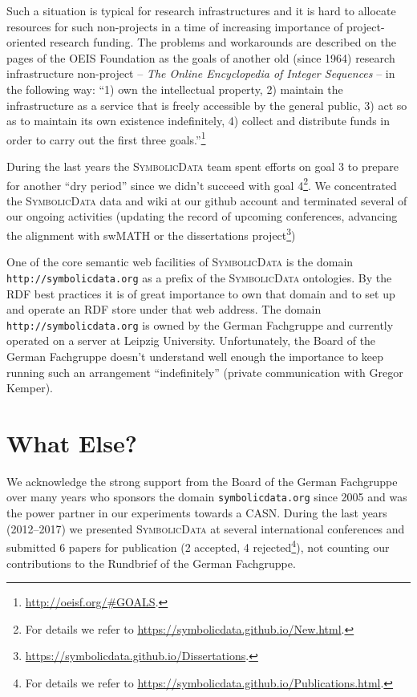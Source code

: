 \documentclass[a4paper,11pt]{article}
\def\SD{\textsc{SymbolicData}}
\begin{document}
Such a situation is typical for research infrastructures and it is hard to
allocate resources for such non-projects in a time of increasing importance of
project-oriented research funding.  The problems and workarounds are described
on the pages of the OEIS Foundation as the goals of another old (since 1964)
research infrastructure non-project -- \emph{The Online Encyclopedia of Integer
  Sequences} -- in the following way: ``1) own the intellectual property, 2)
maintain the infrastructure as a service that is freely accessible by the
general public, 3) act so as to maintain its own existence indefinitely, 4)
collect and distribute funds in order to carry out the first three
goals.''\footnote{\url{http://oeisf.org/\#GOALS}.}

During the last years the {\SD} team spent efforts on goal 3 to prepare for
another ``dry period'' since we didn't succeed with goal 4\footnote{For details
  we refer to \url{https://symbolicdata.github.io/New.html}.}.  We concentrated
the {\SD} data and wiki at our github account and terminated several of our
ongoing activities (updating the record of upcoming conferences, advancing the
alignment with swMATH or the dissertations
project\footnote{\url{https://symbolicdata.github.io/Dissertations}.})

One of the core semantic web facilities of {\SD} is the domain
\texttt{http://symbolicdata.org} as a prefix of the {\SD} ontologies.  By the
RDF best practices it is of great importance to own that domain and to set up
and operate an RDF store under that web address.  The domain
\texttt{http://symbolicdata.org} is owned by the German Fachgruppe and
currently operated on a server at Leipzig University.  Unfortunately, the Board
of the German Fachgruppe doesn't understand well enough the importance to keep
running such an arrangement ``indefinitely'' (private communication with Gregor
Kemper).

\section{What Else?}

We acknowledge the strong support from the Board of the German Fachgruppe over
many years who sponsors the domain \texttt{symbolicdata.org} since 2005 and was
the power partner in our experiments towards a CASN. During the last years
(2012--2017) we presented {\SD} at several international conferences and
submitted 6 papers for publication (2 accepted, 4 rejected\footnote{For details
  we refer to \url{https://symbolicdata.github.io/Publications.html}.}), not
counting our contributions to the Rundbrief of the German Fachgruppe.
\end{document}
